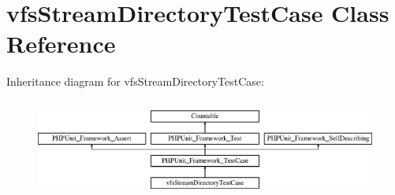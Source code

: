 \hypertarget{classorg_1_1bovigo_1_1vfs_1_1vfs_stream_directory_test_case}{}\section{vfs\+Stream\+Directory\+Test\+Case Class Reference}
\label{classorg_1_1bovigo_1_1vfs_1_1vfs_stream_directory_test_case}
Inheritance diagram for vfs\+Stream\+Directory\+Test\+Case\+:\begin{figure}[H]
\begin{center}
\leavevmode
\includegraphics[height=3.303835cm]{classorg_1_1bovigo_1_1vfs_1_1vfs_stream_directory_test_case}
\end{center}
\end{figure}
